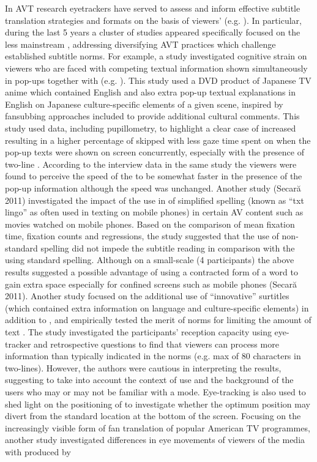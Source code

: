 \documentclass[output=paper]{langsci/langscibook}
\begin{document}
In AVT research eyetrackers have served to assess and inform effective subtitle translation strategies and formats on the basis of viewers'  (e.g. \citealt{ghia2012}). In particular, during the last 5 years a cluster of studies appeared specifically focused on the less mainstream , addressing diversifying AVT practices which challenge established subtitle norms. For example, a study investigated cognitive strain on viewers who are faced with competing textual information shown simultaneously in pop-ups together with  (e.g. \citealt{caffrey2009}). This study used a DVD product of Japanese TV anime which contained English  and also extra pop-up textual explanations in English on Japanese culture-specific elements of a given scene, inspired by fansubbing approaches included to provide additional cultural comments.  This study used  data, including pupillometry, to highlight a clear case of increased  resulting in a higher percentage of skipped  with less gaze time spent on  when the pop-up texts were shown on screen concurrently, especially with the presence of two-line . According to the interview data in the same study the viewers were found to perceive the speed of the  to be somewhat faster in the presence of the pop-up information although the speed was unchanged. Another study (Secar\u{a} 2011) investigated the impact of the use in  of simplified spelling (known as ``txt lingo'' as often used in texting on mobile phones) in certain AV content such as movies watched on mobile phones. Based on the comparison of mean fixation time, fixation counts and regressions, the study suggested that the use of non-standard spelling did not impede the subtitle reading in comparison with the  using standard spelling. Although on a small-scale (4 participants) the above results suggested a possible advantage of using a contracted form of a word to gain extra space especially for confined screens such as mobile phones (Secar\u{a} 2011). Another study focused on the additional use of ``innovative'' surtitles (which contained extra information on language and culture-specific elements) in addition to , and empirically tested the merit of  norms for limiting the amount of text \citep{Künzli2011}. The study investigated the participants' reception capacity using eye-tracker and retrospective questions to find that viewers can process more information than typically indicated in the  norms (e.g. max of 80 characters in two-lines). However, the authors were cautious in interpreting the results, suggesting to take into account the context of use and the background of the users who may or may not be familiar with a  mode.  Eye-tracking is also used to shed light on the positioning of  \citep{Fox2013} to investigate whether the optimum position may divert from the standard location at the bottom of the screen. Focusing on the increasingly visible form of fan translation of popular American TV programmes, another study investigated differences in eye movements of viewers of the media with  produced by 
\end{document}
